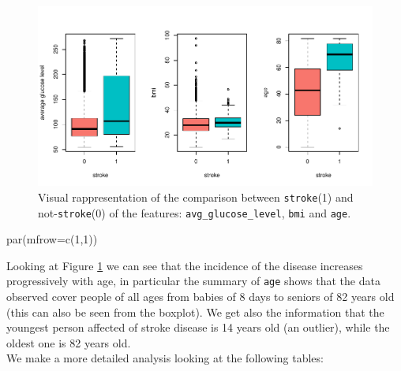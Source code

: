 \documentclass[
]{article}
\newenvironment{Shaded}{\begin{snugshade}}{\end{snugshade}}
\newcommand{\AttributeTok}[1]{\textcolor[rgb]{0.77,0.63,0.00}{#1}}
\newcommand{\DecValTok}[1]{\textcolor[rgb]{0.00,0.00,0.81}{#1}}
\newcommand{\FloatTok}[1]{\textcolor[rgb]{0.00,0.00,0.81}{#1}}
\newcommand{\FunctionTok}[1]{\textcolor[rgb]{0.00,0.00,0.00}{#1}}
\newcommand{\NormalTok}[1]{#1}
\newcommand{\OtherTok}[1]{\textcolor[rgb]{0.56,0.35,0.01}{#1}}
\newcommand{\SpecialCharTok}[1]{\textcolor[rgb]{0.00,0.00,0.00}{#1}}
\newcommand{\StringTok}[1]{\textcolor[rgb]{0.31,0.60,0.02}{#1}}
\begin{document}
\begin{figure}
\centering
\includegraphics{stat-project-stroke_files/figure-latex/bp_stroke-1.pdf}
\caption{\label{bp_stroke}Visual rappresentation of the comparison
between \texttt{stroke}(1) and not-\texttt{stroke}(0) of the features:
\texttt{avg\_glucose\_level}, \texttt{bmi} and \texttt{age}.}
\end{figure}

\begin{Shaded}
\begin{Highlighting}[]
\FunctionTok{par}\NormalTok{(}\AttributeTok{mfrow=}\FunctionTok{c}\NormalTok{(}\DecValTok{1}\NormalTok{,}\DecValTok{1}\NormalTok{))}
\end{Highlighting}
\end{Shaded}

Looking at Figure \ref{bp_stroke} we can see that the incidence of the
disease increases progressively with age, in particular the summary of
\texttt{age} shows that the data observed cover people of all ages from
babies of 8 days to seniors of 82 years old (this can also be seen from the boxplot). We get also the information that the youngest person
affected of stroke disease is 14 years old (an outlier), while the
oldest one is 82 years old.\\
We make a more detailed analysis looking at the following tables:

\begin{Shaded}
\end{Shaded}
\end{document}
